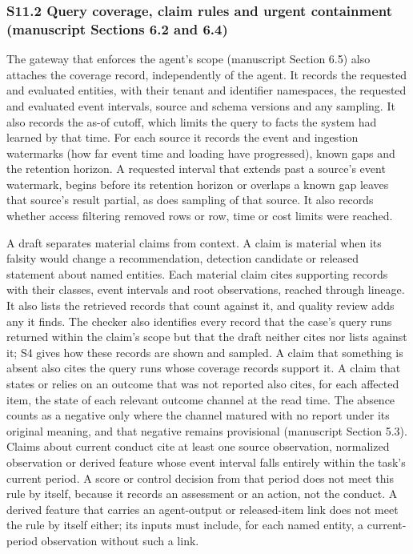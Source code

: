 \documentclass[
  11pt,
]{article}
\begin{document}
\hypertarget{s11.2-query-coverage-claim-rules-and-urgent-containment-manuscript-sections-6.2-and-6.4}{%
\subsubsection{S11.2 Query coverage, claim rules and urgent containment
(manuscript Sections 6.2 and
6.4)}\label{s11.2-query-coverage-claim-rules-and-urgent-containment-manuscript-sections-6.2-and-6.4}}

The gateway that enforces the agent's scope (manuscript Section 6.5)
also attaches the coverage record, independently of the agent. It
records the requested and evaluated entities, with their tenant and
identifier namespaces, the requested and evaluated event intervals,
source and schema versions and any sampling. It also records the as-of
cutoff, which limits the query to facts the system had learned by that
time. For each source it records the event and ingestion watermarks (how
far event time and loading have progressed), known gaps and the
retention horizon. A requested interval that extends past a source's
event watermark, begins before its retention horizon or overlaps a known
gap leaves that source's result partial, as does sampling of that
source. It also records whether access filtering removed rows or row,
time or cost limits were reached.

A draft separates material claims from context. A claim is material when
its falsity would change a recommendation, detection candidate or
released statement about named entities. Each material claim cites
supporting records with their classes, event intervals and root
observations, reached through lineage. It also lists the retrieved
records that count against it, and quality review adds any it finds. The
checker also identifies every record that the case's query runs returned
within the claim's scope but that the draft neither cites nor lists
against it; S4 gives how these records are shown and sampled. A claim
that something is absent also cites the query runs whose coverage
records support it. A claim that states or relies on an outcome that was
not reported also cites, for each affected item, the state of each
relevant outcome channel at the read time. The absence counts as a
negative only where the channel matured with no report under its
original meaning, and that negative remains provisional (manuscript
Section 5.3). Claims about current conduct cite at least one source
observation, normalized observation or derived feature whose event
interval falls entirely within the task's current period. A score or
control decision from that period does not meet this rule by itself,
because it records an assessment or an action, not the conduct. A
derived feature that carries an agent-output or released-item link does
not meet the rule by itself either; its inputs must include, for each
named entity, a current-period observation without such a link.
\end{document}

